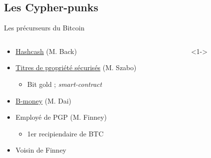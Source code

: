 \documentclass[presentation]{beamer}
\begin{document}
\subsection{Les Cypher-punks}
\label{sec:orgd12e48a}
\begin{frame}[label={sec:orgb23d075}]{Les précurseurs du Bitcoin}
\begin{columns}
\begin{column}{0.6\columnwidth}
\begin{block}{}
\begin{itemize}
\item <1-> \href{https://en.bitcoinwiki.org/wiki/Hashcash}{Hashcash} (M. Back)
\item <2-> \href{https://nakamotoinstitute.org/secure-property-titles/}{Titres de propriété sécurisés}  (M. Szabo)
\begin{itemize}
\item Bit gold ; \emph{smart-contract}
\end{itemize}
\item <3-> \href{http://www.weidai.com/bmoney.txt}{B-money} (M. Dai)
\item <4-> Employé de PGP (M. Finney)
\begin{itemize}
\item 1er recipiendaire de BTC
\end{itemize}
\item <5> Voisin de Finney
\end{itemize}
\end{block}
\end{column}

\begin{column}{0.4\columnwidth}
\begin{block}<1->{}
\end{block}
\end{column}
\end{columns}
\end{frame}
\end{document}
